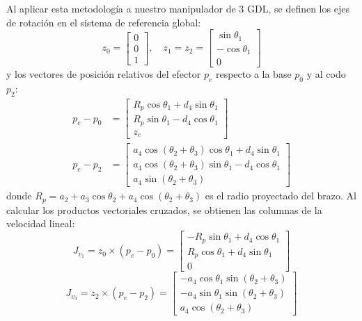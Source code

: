 \documentclass[conference,a4paper]{IEEEtran}
\begin{document}
Al aplicar esta metodología a nuestro manipulador de 3 GDL, se definen los ejes de rotación en el sistema de referencia global:
\begin{equation}
z_0 = \begin{bmatrix} 0 \\ 0 \\ 1 \end{bmatrix}, \quad z_1 = z_2 = \begin{bmatrix} \sin\theta_1 \\ -\cos\theta_1 \\ 0 \end{bmatrix}
\end{equation}
y los vectores de posición relativos del efector $p_e$ respecto a la base $p_0$ y al codo $p_2$:
\begin{align}
p_e - p_0 &= \begin{bmatrix} R_p \cos\theta_1 + d_4 \sin\theta_1 \\ R_p \sin\theta_1 - d_4 \cos\theta_1 \\ z_e \end{bmatrix} \\
p_e - p_2 &= \begin{bmatrix} a_4 \cos(\theta_2+\theta_3)\cos\theta_1 + d_4\sin\theta_1 \\ a_4\cos(\theta_2+\theta_3)\sin\theta_1 - d_4\cos\theta_1 \\ a_4\sin(\theta_2+\theta_3) \end{bmatrix}
\end{align}
donde $R_p = a_2 + a_3 \cos\theta_2 + a_4 \cos(\theta_2 + \theta_3)$ es el radio proyectado del brazo. Al calcular los productos vectoriales cruzados, se obtienen las columnas de la velocidad lineal:
\begin{equation}
J_{v_1} = z_0 \times (p_e - p_0) = \begin{bmatrix} -R_p \sin\theta_1 + d_4 \cos\theta_1 \\ R_p \cos\theta_1 + d_4 \sin\theta_1 \\ 0 \end{bmatrix}
\end{equation}
\begin{equation}
J_{v_3} = z_2 \times (p_e - p_2) = \begin{bmatrix} -a_4 \cos\theta_1 \sin(\theta_2+\theta_3) \\ -a_4 \sin\theta_1 \sin(\theta_2+\theta_3) \\ a_4 \cos(\theta_2+\theta_3) \end{bmatrix}
\end{equation}
\end{document}
